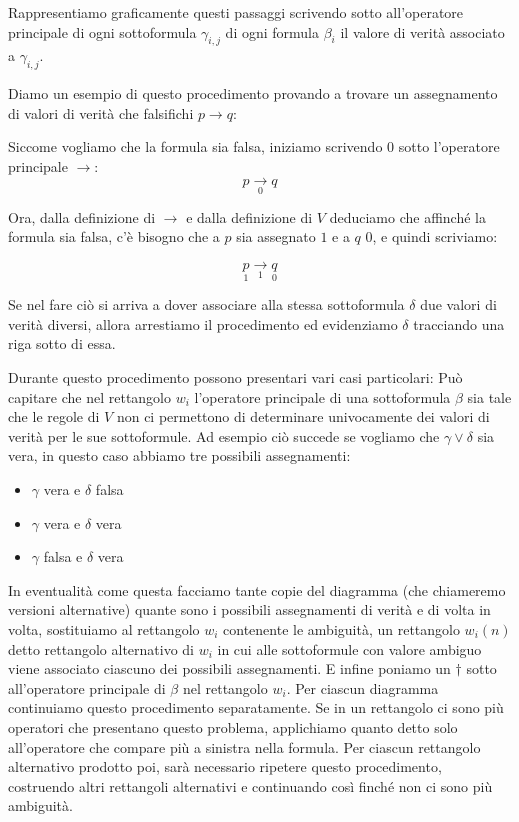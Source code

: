 \documentclass[a4paper, titlepage, 12pt]{report}
\begin{document}
Rappresentiamo graficamente questi passaggi scrivendo sotto all'operatore principale
di ogni sottoformula $\gamma_{i,j}$ di ogni formula $\beta_i$
il valore di verità associato a $\gamma_{i,j}$.

Diamo un esempio di questo procedimento provando a trovare un assegnamento
di valori di verità che falsifichi $p \rightarrow q$:

Siccome vogliamo che la formula sia falsa, iniziamo scrivendo $0$ sotto l'operatore principale $\rightarrow$:
$$p \underset{0}{\rightarrow} q$$

Ora, dalla definizione di $\rightarrow$ e dalla definizione di $V$
deduciamo che affinché la formula sia falsa, c'è bisogno
che a $p$ sia assegnato $1$ e a $q$ $0$, e quindi scriviamo:

$$\underset{1}{p} \underset{1}{\rightarrow} \underset{0}{q}$$

Se nel fare ciò si arriva a dover associare alla stessa sottoformula $\delta$
due valori di verità diversi, allora arrestiamo il procedimento ed evidenziamo
$\delta$ tracciando una riga sotto di essa.

Durante questo procedimento possono presentari vari casi particolari:
Può capitare che nel rettangolo $w_i$ l'operatore principale di una sottoformula $\beta$ sia tale che le regole di $V$
non ci permettono di determinare univocamente dei valori di verità per le sue sottoformule.
Ad esempio ciò succede se vogliamo che $\gamma \lor \delta$ sia vera, in questo caso abbiamo tre possibili
assegnamenti:
\begin{itemize}
    \item $\gamma$ vera  e $\delta$ falsa
    \item $\gamma$ vera  e $\delta$ vera
    \item $\gamma$ falsa e $\delta$ vera
\end{itemize}

In eventualità come questa facciamo tante copie del diagramma (che chiameremo versioni alternative)
quante sono i possibili assegnamenti di verità e di volta in volta, sostituiamo al rettangolo $w_i$ contenente le ambiguità,
un rettangolo $w_i(n)$ detto rettangolo alternativo di $w_i$ in cui alle sottoformule
con valore ambiguo viene associato ciascuno dei possibili assegnamenti.
E infine poniamo un $\dagger$ sotto all'operatore principale di $\beta$ nel rettangolo $w_i$.
Per ciascun diagramma continuiamo questo procedimento separatamente.
Se in un rettangolo ci sono più operatori che presentano questo problema,
applichiamo quanto detto solo all'operatore che compare più a sinistra nella formula.
Per ciascun rettangolo alternativo prodotto poi, sarà necessario ripetere
questo procedimento, costruendo altri rettangoli alternativi e continuando così
finché non ci sono più ambiguità.
\end{document}
